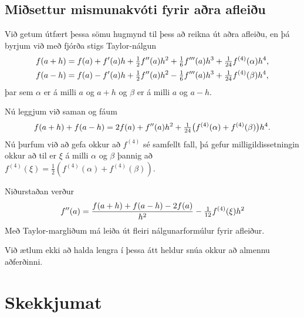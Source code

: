 \documentclass[A4paper,10pt,icelandic]{sphinxmanual}
\begin{document}

\subsection{Miðsettur mismunakvóti fyrir aðra afleiðu}
\label{kafli04:misettur-mismunakvoti-fyrir-ara-afleiu}\label{kafli04:index-4}
Við getum útfært þessa sömu hugmynd til þess að reikna út aðra afleiðu,
en þá byrjum við með fjórða stigs Taylor-nálgun
\begin{gather}
\begin{split}\begin{aligned}
  f(a+h)&=f(a)+f'(a)h+\tfrac 12 f''(a)h^2+\tfrac 16 f'''(a)h^3
+\tfrac 1{24}f^{(4)}(\alpha)h^4,\\
  f(a-h)&=f(a)-f'(a)h+\tfrac 12 f''(a)h^2-\tfrac 16 f'''(a)h^3
+\tfrac 1{24}f^{(4)}(\beta)h^4,\end{aligned}\end{split}\notag
\end{gather}
þar sem \(\alpha\) er á milli \(a\) og \(a+h\) og
\(\beta\) er á milli \(a\) og \(a-h\).

Nú leggjum við saman og fáum
\begin{gather}
\begin{split}f(a+h)+f(a-h)=2f(a) +f''(a)h^2+\tfrac
1{24}\big(f^{(4)}(\alpha)+f^{(4)}(\beta)\big)h^4.\end{split}\notag
\end{gather}
Nú þurfum við að gefa okkur að \(f^{(4)}\) sé samfellt fall, þá
gefur milligildissetningin okkur að til er \(\xi\) á milli
\(\alpha\) og \(\beta\) þannig að
\(f^{(4)}(\xi)=\tfrac 12 (f^{(4)}(\alpha)+f^{(4)}(\beta))\).

Niðurstaðan verður
\begin{gather}
\begin{split}f''(a)=\dfrac{f(a+h)+f(a-h)-2f(a)}{h^2}-\tfrac 1{12}f^{(4)}(\xi)h^2\end{split}\notag
\end{gather}
Með Taylor-margliðum má leiða út fleiri nálgunarformúlur fyrir afleiður.

Við ætlum ekki að halda lengra í þessa átt heldur snúa okkur að almennu
aðferðinni.


\section{Skekkjumat}
\label{kafli04:skekkjumat}
\end{document}
